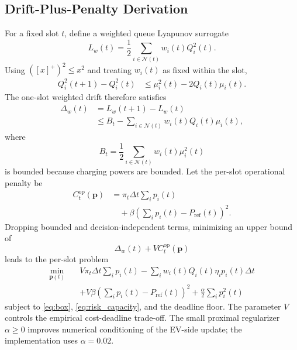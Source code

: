 \documentclass[journal]{IEEEtran}
\begin{document}
\subsection{Drift-Plus-Penalty Derivation}
For a fixed slot $t$, define a weighted queue Lyapunov surrogate
\begin{equation}
L_w(t)=\frac{1}{2}\sum_{i\in\mathcal{N}(t)} w_i(t)Q_i^2(t).
\label{eq:lyapunov}
\end{equation}
Using $([x]^+)^2\le x^2$ and treating $w_i(t)$ as fixed within the slot,
\begin{align}
Q_i^2(t+1)-Q_i^2(t)
&\le \mu_i^2(t)-2Q_i(t)\mu_i(t). \label{eq:queue_square}
\end{align}
The one-slot weighted drift therefore satisfies
\begin{align}
\Delta_w(t)
&=L_w(t+1)-L_w(t) \nonumber\\
&\le B_t-\sum_{i\in\mathcal{N}(t)} w_i(t)Q_i(t)\mu_i(t), \label{eq:drift_bound}
\end{align}
where
\begin{equation}
B_t=\frac{1}{2}\sum_{i\in\mathcal{N}(t)}w_i(t)\mu_i^2(t)
\end{equation}
is bounded because charging powers are bounded. Let the per-slot operational penalty be
\begin{align}
C_t^{\mathrm{op}}(\mathbf p)
&=\pi_t\Delta t\sum_i p_i(t) \nonumber\\
&\quad+\beta\left(\sum_i p_i(t)-P_{\mathrm{ref}}(t)\right)^2 .
\label{eq:slot_cost}
\end{align}
Dropping bounded and decision-independent terms, minimizing an upper bound of
\begin{equation}
\Delta_w(t)+V C_t^{\mathrm{op}}(\mathbf p)
\label{eq:dpp}
\end{equation}
leads to the per-slot problem
\begin{align}
\min_{\mathbf p(t)}\quad
& V\pi_t\Delta t\sum_i p_i(t)
-\sum_i w_i(t)Q_i(t)\eta_i p_i(t)\Delta t \nonumber\\
&+V\beta\left(\sum_i p_i(t)-P_{\mathrm{ref}}(t)\right)^2
+\frac{\alpha}{2}\sum_i p_i^2(t) \label{eq:online_problem}
\end{align}
subject to \eqref{eq:box}, \eqref{eq:risk_capacity}, and the deadline floor. The parameter $V$ controls the empirical cost-deadline trade-off. The small proximal regularizer $\alpha\ge0$ improves numerical conditioning of the EV-side update; the implementation uses $\alpha=0.02$.
\end{document}
